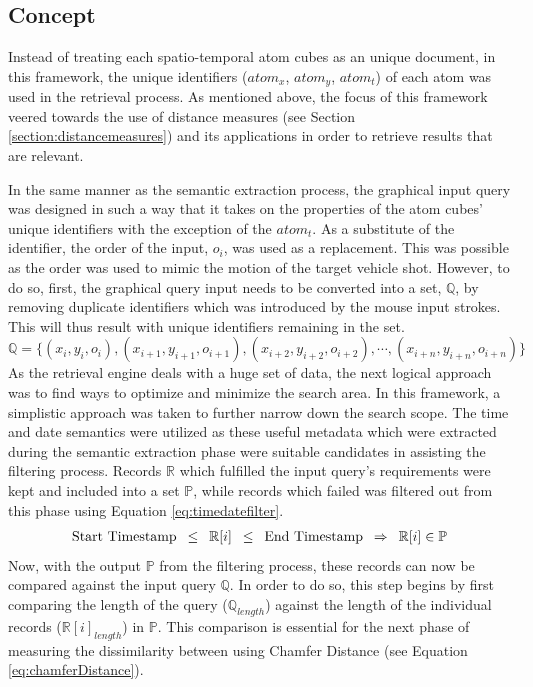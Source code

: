 \subsection{Concept}

Instead of treating each spatio-temporal atom cubes as an unique document, in this framework, the unique identifiers ($atom_x$, $atom_y$, $atom_t$) of each atom was used in the retrieval process. As mentioned above, the focus of this framework veered towards the use of distance measures (see Section \ref{section:distancemeasures}) and its applications in order to retrieve results that are relevant.

In the same manner as the semantic extraction process, the graphical input query was designed in such a way that it takes on the properties of the atom cubes' unique identifiers with the exception of the $atom_t$. As a substitute of the identifier, the order of the input, $o_{i}$, was used as a replacement. This was possible as the order was used to mimic the motion of the target vehicle shot. However, to do so, first, the graphical query input needs to be converted into a set, $\mathbb{Q}$, by removing duplicate identifiers which was introduced by the mouse input strokes. This will thus result with unique identifiers remaining in the set. 
\begin{equation}
    \mathbb{Q} = \{ (x_i, y_i, o_i), (x_{i+1}, y_{i+1}, o_{i+1}), (x_{i+2}, y_{i+2}, o_{i+2}), \dotsb,(x_{i+n}, y_{i+n}, o_{i+n})\}
\end{equation}
As the retrieval engine deals with a huge set of data, the next logical approach was to find ways to optimize and minimize the search area. In this framework, a simplistic approach was taken to further narrow down the search scope. 
The time and date semantics were utilized as these useful metadata which were extracted during the semantic extraction phase were suitable candidates in assisting the filtering process. 
Records $\mathbb{R}$ which fulfilled the input query's requirements were kept and included into a set $\mathbb{P}$, while records which failed was filtered out from this phase using Equation \ref{eq:timedatefilter}.
\begin{gather} 
\label{eq:timedatefilter}
     \text{Start Timestamp} \hspace{.5em} \leq \hspace{.5em} \mathbb{R}[i] \hspace{.5em} \leq \hspace{.5em} \text{End Timestamp} \hspace{.5em} \Rightarrow \hspace{.5em} \mathbb{R}[i] \in \mathbb{P} 
\end{gather}   
Now, with the output $\mathbb{P}$ from the filtering process, these records can now be compared against the input query $\mathbb{Q}$. In order to do so, this step begins by first comparing the length of the query ($\mathbb{Q}_{length}$) against the length of the individual records ($\mathbb{R}[i]_{length}$) in $\mathbb{P}$. This comparison is essential for the next phase of measuring the dissimilarity between using Chamfer Distance (see Equation \ref{eq:chamferDistance}).

